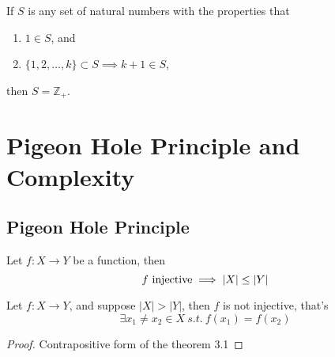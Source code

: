 \documentclass{article}
\def\Z{{\mathbb Z}}
\begin{document}
		
		\begin{theorem}
			If $S$ is any set of natural numbers with the properties that
			\begin{enumerate}
				\item $1 \in S$, and
				\item $\{1, 2, \dots, k\} \subset S \implies k+1 \in S$,
			\end{enumerate}
			then $S = \Z_+$.
		\end{theorem}
	
	\section{Pigeon Hole Principle and Complexity}
		\subsection{Pigeon Hole Principle}
			\begin{theorem}
				Let $f: X \to Y$ be a function, then 
				\begin{equation}
					f \text{{ injective}} \implies |X| \leq |Y|
				\end{equation}
			\end{theorem}
			
			\begin{theorem}
				Let $f: X \to Y$, and suppose $|X| > |Y|$, then $f$ is not injective, that's
				\begin{equation}
					\exists x_1 \neq x_2 \in X\ s.t.\ f(x_1) = f(x_2)
				\end{equation}
				\begin{proof}
					Contrapositive form of the theorem 3.1
				\end{proof}
			\end{theorem}
			
\end{document}
